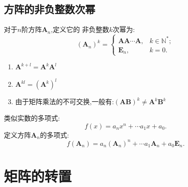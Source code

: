 \subsection{方阵的非负整数次幂}
\begin{formal}
\begin{definition}[方阵的幂]\label{def:方阵的幂}
对于$n$阶方阵$\bm{A}_{n}$,定义它的
非负整数$k$次幂为:
\begin{equation*}
    \left(\bm{A}_n\right)^k = 
    \begin{cases}
        \bm{A}\bm{A} \cdots \bm{A} ,& k \in \mathbb{N} ^*;\\
        \bm{E}_n,&k = 0 .
    \end{cases}
\end{equation*}
\end{definition}
\end{formal}
\begin{formal}
\begin{proposition}[幂的性质]\label{prop:幂的性质}
    \begin{enumerate}[label=\textup{(\arabic*)}]
    \item$\bm{A}^{k + l} = \bm{A}^k\bm{A}^l$
    \item$\bm{A}^{kl} = \left(\bm{A}^{k}\right)^{l}$
    \item 由于矩阵乘法的不可交换,一般有:$\left(
        \bm{A}\bm{B}
    \right)^k\neq \bm{A}^k \bm{B}^k$
\end{enumerate}
\end{proposition}
\end{formal}
\begin{formal}
\begin{definition}[方阵的多项式]\label{def:方阵的多项式}
    类似实数的多项式:
\[
    f\left(x\right) = a_nx^n + \cdots a_1x+a_0.
\]
定义方阵$\bm{A}_n$的多项式:
\[
f\left(\bm{A}_n\right) = a_n\left(\bm{A}_n\right)^n + \cdots a_1\bm{A}_n+a_0\bm{E}_n.
\]
\end{definition}
\end{formal}
\newpage
\section{矩阵的转置}
